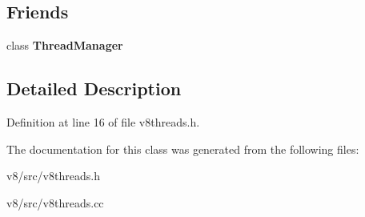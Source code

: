 \subsection*{Friends}
\begin{DoxyCompactItemize}
\item 
\mbox{\label{classv8_1_1internal_1_1ThreadState_a2a28fc3c6cee05204a42286ac77ace1a}} 
class {\bfseries Thread\+Manager}
\end{DoxyCompactItemize}


\subsection{Detailed Description}


Definition at line 16 of file v8threads.\+h.



The documentation for this class was generated from the following files\+:\begin{DoxyCompactItemize}
\item 
v8/src/v8threads.\+h\item 
v8/src/v8threads.\+cc\end{DoxyCompactItemize}
